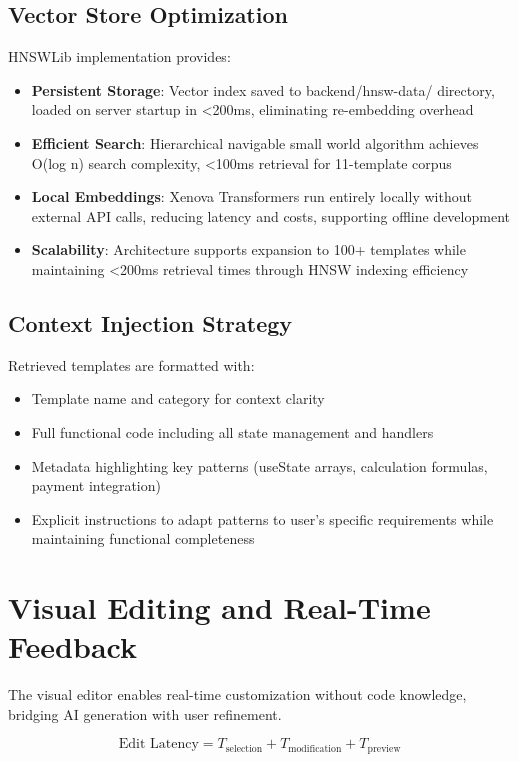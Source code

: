 \documentclass[10pt, conference, letterpaper]{IEEEtran}
\begin{document}
\subsection{Vector Store Optimization}
HNSWLib implementation provides:
\begin{itemize}
    \item \textbf{Persistent Storage}: Vector index saved to backend/hnsw-data/ directory, loaded on server startup in <200ms, eliminating re-embedding overhead
    \item \textbf{Efficient Search}: Hierarchical navigable small world algorithm achieves O(log n) search complexity, <100ms retrieval for 11-template corpus
    \item \textbf{Local Embeddings}: Xenova Transformers run entirely locally without external API calls, reducing latency and costs, supporting offline development
    \item \textbf{Scalability}: Architecture supports expansion to 100+ templates while maintaining <200ms retrieval times through HNSW indexing efficiency
\end{itemize}

\subsection{Context Injection Strategy}
Retrieved templates are formatted with:
\begin{itemize}
    \item Template name and category for context clarity
    \item Full functional code including all state management and handlers
    \item Metadata highlighting key patterns (useState arrays, calculation formulas, payment integration)
    \item Explicit instructions to adapt patterns to user's specific requirements while maintaining functional completeness
\end{itemize}

\section{Visual Editing and Real-Time Feedback}
The visual editor enables real-time customization without code knowledge, bridging AI generation with user refinement.

\begin{equation}
\text{Edit Latency} = T_{\text{selection}} + T_{\text{modification}} + T_{\text{preview}}
\end{equation}
\end{document}
